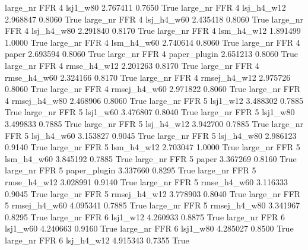   large_nr      FFR                 4     lsj1_w80    2.767411      0.7650    True
  large_nr      FFR                 4   lsj_h4_w12    2.968847      0.8060    True
  large_nr      FFR                 4   lsj_h4_w60    2.435418      0.8060    True
  large_nr      FFR                 4   lsj_h4_w80    2.291840      0.8170    True
  large_nr      FFR                 4   lsm_h4_w12    1.891499      1.0000    True
  large_nr      FFR                 4   lsm_h4_w60    2.740614      0.8060    True
  large_nr      FFR                 4        paper    2.693594      0.8060    True
  large_nr      FFR                 4 paper_plugin    2.651213      0.8060    True
  large_nr      FFR                 4  rmse_h4_w12    2.201263      0.8170    True
  large_nr      FFR                 4  rmse_h4_w60    2.324166      0.8170    True
  large_nr      FFR                 4 rmsej_h4_w12    2.975726      0.8060    True
  large_nr      FFR                 4 rmsej_h4_w60    2.971822      0.8060    True
  large_nr      FFR                 4 rmsej_h4_w80    2.468906      0.8060    True
  large_nr      FFR                 5     lsj1_w12    3.488302      0.7885    True
  large_nr      FFR                 5     lsj1_w60    3.476807      0.8040    True
  large_nr      FFR                 5     lsj1_w80    3.499833      0.7885    True
  large_nr      FFR                 5   lsj_h4_w12    3.942700      0.7885    True
  large_nr      FFR                 5   lsj_h4_w60    3.153827      0.9045    True
  large_nr      FFR                 5   lsj_h4_w80    2.986123      0.9140    True
  large_nr      FFR                 5   lsm_h4_w12    2.703047      1.0000    True
  large_nr      FFR                 5   lsm_h4_w60    3.845192      0.7885    True
  large_nr      FFR                 5        paper    3.367269      0.8160    True
  large_nr      FFR                 5 paper_plugin    3.337660      0.8295    True
  large_nr      FFR                 5  rmse_h4_w12    3.028991      0.9140    True
  large_nr      FFR                 5  rmse_h4_w60    3.116333      0.9045    True
  large_nr      FFR                 5 rmsej_h4_w12    3.778903      0.8040    True
  large_nr      FFR                 5 rmsej_h4_w60    4.095341      0.7885    True
  large_nr      FFR                 5 rmsej_h4_w80    3.341967      0.8295    True
  large_nr      FFR                 6     lsj1_w12    4.260933      0.8875    True
  large_nr      FFR                 6     lsj1_w60    4.240663      0.9160    True
  large_nr      FFR                 6     lsj1_w80    4.285027      0.8500    True
  large_nr      FFR                 6   lsj_h4_w12    4.915343      0.7355    True
